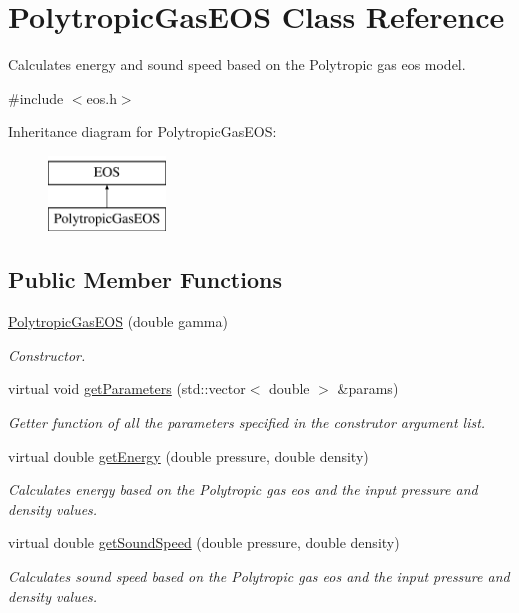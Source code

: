 \hypertarget{classPolytropicGasEOS}{\section{Polytropic\-Gas\-E\-O\-S Class Reference}
\label{classPolytropicGasEOS}
}


Calculates energy and sound speed based on the Polytropic gas eos model.  




{\ttfamily \#include $<$eos.\-h$>$}

Inheritance diagram for Polytropic\-Gas\-E\-O\-S\-:\begin{figure}[H]
\begin{center}
\leavevmode
\includegraphics[height=2.000000cm]{classPolytropicGasEOS}
\end{center}
\end{figure}
\subsection*{Public Member Functions}
\begin{DoxyCompactItemize}
\item 
\hyperlink{classPolytropicGasEOS_aa332e62d30c0b388c999c547c75fbd5a}{Polytropic\-Gas\-E\-O\-S} (double gamma)
\begin{DoxyCompactList}\small\item\em Constructor. \end{DoxyCompactList}\item 
virtual void \hyperlink{classPolytropicGasEOS_adc6cca9144a7797fd78908467b4d438f}{get\-Parameters} (std\-::vector$<$ double $>$ \&params)
\begin{DoxyCompactList}\small\item\em Getter function of all the parameters specified in the construtor argument list. \end{DoxyCompactList}\item 
virtual double \hyperlink{classPolytropicGasEOS_a754b30cb17e7e112d985dd1fe9d5051f}{get\-Energy} (double pressure, double density)
\begin{DoxyCompactList}\small\item\em Calculates energy based on the Polytropic gas eos and the input pressure and density values. \end{DoxyCompactList}\item 
virtual double \hyperlink{classPolytropicGasEOS_a2f562ecc76589538fd88b78d3b5497f5}{get\-Sound\-Speed} (double pressure, double density)
\begin{DoxyCompactList}\small\item\em Calculates sound speed based on the Polytropic gas eos and the input pressure and density values. \end{DoxyCompactList}\end{DoxyCompactItemize}
